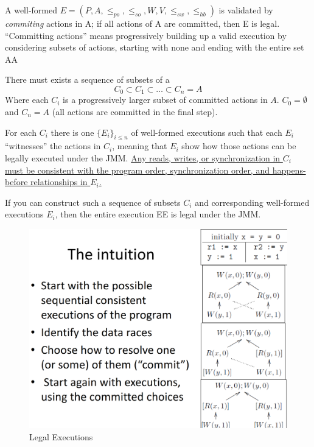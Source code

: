 A well-formed $E = (P,A,\leq_{po},\leq_{so},W,V,\leq_{sw},\leq_{hb})$ is validated by \textit{commiting} actions in A;
if all actions of A are committed, then E is legal.
``Committing actions'' means progressively building up a valid execution by considering subsets of actions, starting with none and ending with the entire set AA

There must exists a sequence of subsets of a
\[
  C_0 \subset C_1 \subset \dots \subset C_n = A 
\]
Where each $C_i$ is a progressively larger subset of committed actions in $A$. $C_0 = \emptyset$ and $C_n = A$ (all actions are committed in the final step).

For each $C_i$ there is one $\{E_i\}_{i\leq n}$ of well-formed executions such that each $E_i$ ``witnesses'' the actions in $C_i$, meaning that $E_i$ show how those actions can be legally executed under the JMM.
\ul{Any reads, writes, or synchronization in $C_i$ must be consistent with the program order, synchronization order, and happens-before relationships in $E_i$.}

If you can construct such a sequence of subsets $C_i$ and corresponding well-formed executions $E_i$, then the entire execution EE is legal under the JMM.


\begin{figure}[htbp]
   \centering
   \includegraphics{images/legal_executions.png}
   \caption{Legal Executions}
   \label{fig:legal_executions}
\end{figure}

